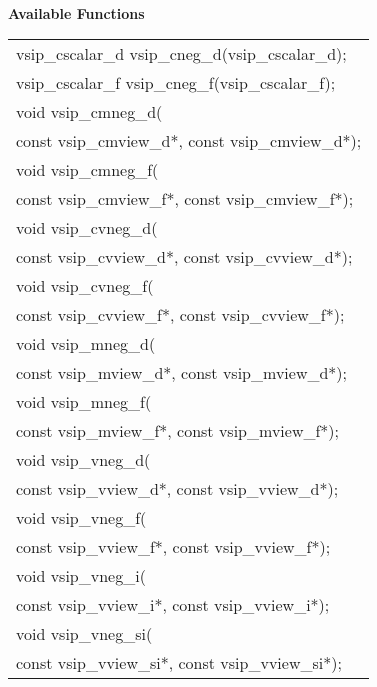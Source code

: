 \\\cvsiplh
\newline \hspace*{.8cm} \vspace*{.1cm} \textbf{Available Functions }
\newline \hspace*{1.1cm} {
\ttfamily
\begin{tabular}[H]{l}
vsip\_cscalar\_d vsip\_cneg\_d(vsip\_cscalar\_d);\\
vsip\_cscalar\_f vsip\_cneg\_f(vsip\_cscalar\_f);\\
void vsip\_cmneg\_d(\\*\hspace{.6cm}const vsip\_cmview\_d*, const vsip\_cmview\_d*);\\
void vsip\_cmneg\_f(\\*\hspace{.6cm}const vsip\_cmview\_f*, const vsip\_cmview\_f*);\\
void vsip\_cvneg\_d(\\*\hspace{.6cm}const vsip\_cvview\_d*, const vsip\_cvview\_d*);\\
void vsip\_cvneg\_f(\\*\hspace{.6cm}const vsip\_cvview\_f*, const vsip\_cvview\_f*);\\
void vsip\_mneg\_d(\\*\hspace{.6cm}const vsip\_mview\_d*, const vsip\_mview\_d*);\\
void vsip\_mneg\_f(\\*\hspace{.6cm}const vsip\_mview\_f*, const vsip\_mview\_f*);\\
void vsip\_vneg\_d(\\*\hspace{.6cm}const vsip\_vview\_d*, const vsip\_vview\_d*);\\
void vsip\_vneg\_f(\\*\hspace{.6cm}const vsip\_vview\_f*, const vsip\_vview\_f*);\\
void vsip\_vneg\_i(\\*\hspace{.6cm}const vsip\_vview\_i*, const vsip\_vview\_i*);\\
void vsip\_vneg\_si(\\*\hspace{.6cm}const vsip\_vview\_si*, const vsip\_vview\_si*);\\
\end{tabular}
}
\\\pyjvsiph
